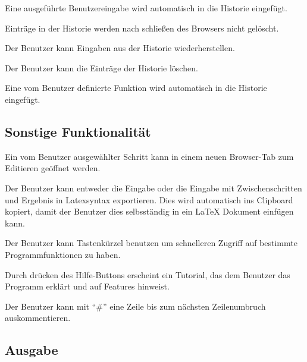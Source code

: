 \documentclass[parskip=full,11pt,twoside]{scrartcl}
\begin{document}
Eine ausgeführte Benutzereingabe wird automatisch in die Historie eingefügt.

Einträge in der Historie werden nach schließen des Browsers nicht gelöscht.

Der Benutzer kann Eingaben aus der Historie wiederherstellen.

Der Benutzer kann die Einträge der Historie löschen.

Eine vom Benutzer definierte Funktion wird automatisch in die Historie eingefügt.




\subsection{Sonstige Funktionalität}

Ein vom Benutzer ausgewählter Schritt kann in einem neuen Browser-Tab zum Editieren geöffnet werden.

Der Benutzer kann entweder die Eingabe oder die Eingabe mit Zwischenschritten und Ergebnis in Latexsyntax exportieren. Dies wird automatisch ins Clipboard kopiert, damit der Benutzer dies selbsständig in ein LaTeX Dokument einfügen kann.

Der Benutzer kann Tastenkürzel benutzen um schnelleren Zugriff auf bestimmte Programmfunktionen zu haben.

Durch drücken des Hilfe-Buttons erscheint ein Tutorial, das dem Benutzer das Programm erklärt und auf Features hinweist.

Der Benutzer kann mit \enquote{\#} eine Zeile bis zum nächsten Zeilenumbruch auskommentieren.




\subsection{Ausgabe}
\end{document}

